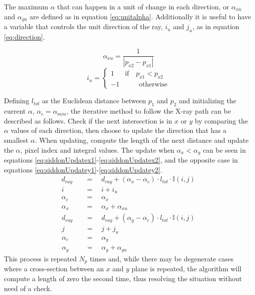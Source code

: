 The maximum $\alpha$ that can happen in a unit of change in each direction, or $\alpha_{xu}$ and $\alpha_{yu}$ are defined as in equation \ref{eq:unitalpha}. Additionally it is useful to have a variable that controls the unit direction of the ray, $i_u$ and $j_u$, as in equation \ref{eq:direction}.

\begin{equation}
\alpha_{xu}=\frac{1}{\left|p_{x2}-p_{x1} \right|}\label{eq:unitalpha}
\end{equation}
\begin{equation}
i_u=
\begin{cases}
1 & \text{if}\quad p_{x1}< p_{x2}\\
-1 &\quad\quad\text{otherwise}
\end{cases}\label{eq:direction}
\end{equation}

Defining $l_{tot}$ as the Euclidean distance between $p_1$ and $p_2$ and initializing the current $\alpha$, $\alpha_c=\alpha_{min}$, the iterative method to follow the X-ray path can be described as follows. Check if the next intersection is in $x$ or $y$ by comparing the $\alpha$ values of each direction, then choose to update the direction that has a smallest $\alpha$. When updating, compute the length of the next distance and update the $\alpha$, pixel index and integral values. The update when $\alpha_x<\alpha_y$ can be seen in equations \ref{eq:siddonUpdatex1}-\ref{eq:siddonUpdatex2}, and the opposite case in equations  \ref{eq:siddonUpdatey1}-\ref{eq:siddonUpdatey2}.
\begin{align}
d_{ray}\quad&=\quad d_{ray}+(\alpha_x-\alpha_c)\cdot l_{tot} \cdot\mathbb{I}(i,j)\label{eq:siddonUpdatex1}\\
i\quad&=\quad i+i_u\\
\alpha_c\quad&=\quad\alpha_x\\
\alpha_x\quad&=\quad\alpha_x+\alpha_{xu}\label{eq:siddonUpdatex2}
\end{align}
\begin{align}
d_{ray}\quad&=\quad d_{ray}+(\alpha_y-\alpha_c)\cdot l_{tot}\cdot\mathbb{I}(i,j)\label{eq:siddonUpdatey1}\\
j\quad&=\quad j+j_u\\
\alpha_c\quad&=\quad\alpha_y\\
\alpha_y\quad&=\quad\alpha_y+\alpha_{yu}\label{eq:siddonUpdatey2}
\end{align}
This process is repeated $N_p$ times and, while there may be degenerate cases where a cross-section between an $x$ and $y$ plane is repeated, the algorithm will compute a length of zero the second time, thus resolving the situation without need of a check.




